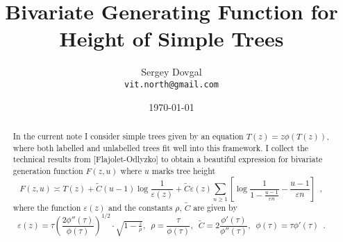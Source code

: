 \documentclass[a4paper]{article}
\title{
Bivariate Generating Function for Height of Simple Trees}
\author{
Sergey Dovgal
\\
\texttt{vit.north@gmail.com}
}
\date{\today}
\begin{document}
\maketitle


\begin{abstract}
In the current note I consider simple trees given by an equation
\(
    T(z) = z \phi(T(z))
\),
where both labelled and unlabelled trees fit well into this framework. I collect the
technical results from [Flajolet-Odlyzko] to obtain a beautiful
expression for bivariate generation function \( F(z, u) \) where \( u \) marks
tree height
\[
    \boxed{
    F(z, u) \asymp
        T(z) +
        \widetilde C (u-1) \log \dfrac{1}{\varepsilon(z) }
        +
        \widetilde C \varepsilon(z) \sum_{n \geq 1}
        \left[
            \log \dfrac{1}{1 - \tfrac{u-1}{\varepsilon n}} - \dfrac{u-1}{\varepsilon n} 
        \right]
    }
\enspace , 
\]
where the function \( \varepsilon(z) \) and the constants \( \rho \), \( \widetilde C \) are given by
\[
    \varepsilon(z) = \tau \left( \dfrac{2 \phi''(\tau)}{\phi(\tau)}
\right)^{1/2}\cdot \sqrt{1 - \tfrac z \rho} , \enspace 
    \rho = \dfrac{\tau}{\phi(\tau) } , \enspace 
    \widetilde C = 2 \dfrac{\phi'(\tau)}{\phi''(\tau)}
    , \enspace   
    \phi(\tau) = \tau \phi'(\tau) 
    \enspace .
\]
\end{abstract}
\end{document}
